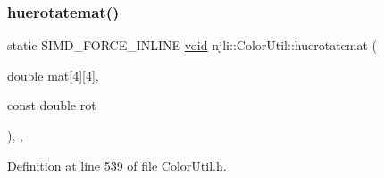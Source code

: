 \subsubsection{\texorpdfstring{huerotatemat()}{huerotatemat()}}
{\footnotesize\ttfamily static S\+I\+M\+D\+\_\+\+F\+O\+R\+C\+E\+\_\+\+I\+N\+L\+I\+NE \mbox{\hyperlink{_thread_8h_af1e856da2e658414cb2456cb6f7ebc66}{void}} njli\+::\+Color\+Util\+::huerotatemat (\begin{DoxyParamCaption}\item[{double}]{mat\mbox{[}4\mbox{]}\mbox{[}4\mbox{]},  }\item[{const double}]{rot }\end{DoxyParamCaption})\hspace{0.3cm}{\ttfamily [inline]}, {\ttfamily [static]}, {\ttfamily [protected]}}



Definition at line 539 of file Color\+Util.\+h.



